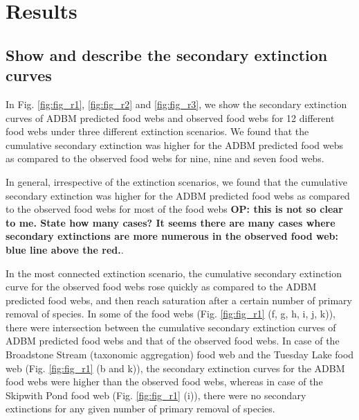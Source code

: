 \documentclass{article}
\begin{document}
\hypertarget{results}{%
\section{Results}\label{results}}

\hypertarget{show-and-describe-the-secondary-extinction-curves}{%
\subsection{Show and describe the secondary extinction
curves}\label{show-and-describe-the-secondary-extinction-curves}}

In Fig. \ref{fig:fig_r1}, \ref{fig:fig_r2} and \ref{fig:fig_r3}, we show
the secondary extinction curves of ADBM predicted food webs and observed
food webs for 12 different food webs under three different extinction
scenarios. We found that the cumulative secondary extinction was higher
for the ADBM predicted food webs as compared to the observed food webs
for nine, nine and seven food webs.

In general, irrespective of the extinction scenarios, we found that the
cumulative secondary extinction was higher for the ADBM predicted food
webs as compared to the observed food webs for most of the food webs
\textbf{OP: this is not so clear to me. State how many cases? It seems
there are many cases where secondary extinctions are more numerous in
the observed food web: blue line above the red.}.

In the most connected extinction scenario, the cumulative secondary
extinction curve for the observed food webs rose quickly as compared to
the ADBM predicted food webs, and then reach saturation after a certain
number of primary removal of species. In some of the food webs (Fig.
\ref{fig:fig_r1} (f, g, h, i, j, k)), there were intersection between
the cumulative secondary extinction curves of ADBM predicted food webs
and that of the observed food webs. In case of the Broadstone Stream
(taxonomic aggregation) food web and the Tuesday Lake food web (Fig.
\ref{fig:fig_r1} (b and k)), the secondary extinction curves for the
ADBM food webs were higher than the observed food webs, whereas in case
of the Skipwith Pond food web (Fig. \ref{fig:fig_r1} (i)), there were no
secondary extinctions for any given number of primary removal of
species.
\end{document}
